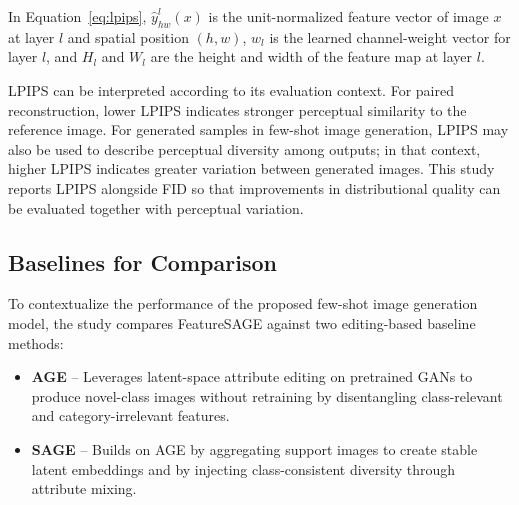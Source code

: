 \begin{enumerate}[listparindent=\parindent, parsep=0pt]
    In Equation~\eqref{eq:lpips}, $\hat{y}_{hw}^{l}(x)$ is the unit-normalized feature vector of image $x$ at layer $l$ and spatial position $(h,w)$, $w_l$ is the learned channel-weight vector for layer $l$, and $H_l$ and $W_l$ are the height and width of the feature map at layer $l$.

    LPIPS can be interpreted according to its evaluation context. For paired reconstruction, lower LPIPS indicates stronger perceptual similarity to the reference image. For generated samples in few-shot image generation, LPIPS may also be used to describe perceptual diversity among outputs; in that context, higher LPIPS indicates greater variation between generated images. This study reports LPIPS alongside FID so that improvements in distributional quality can be evaluated together with perceptual variation.
\end{enumerate}

\subsection{Baselines for Comparison}

To contextualize the performance of the proposed few-shot image generation model, the study compares FeatureSAGE against two editing-based baseline methods:

\begin{itemize}
    \item \textbf{AGE} \citep{AGE} -- Leverages latent-space attribute editing on pretrained GANs to produce novel-class images without retraining by disentangling class-relevant and category-irrelevant features.
    \item \textbf{SAGE} \citep{ding2023stableattributegroupediting} -- Builds on AGE by aggregating support images to create stable latent embeddings and by injecting class-consistent diversity through attribute mixing.
\end{itemize}
